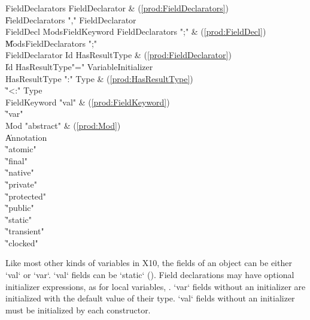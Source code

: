 \begin{bbgrammar}
    FieldDeclarators \: FieldDeclarator & (\ref{prod:FieldDeclarators}) \\
                     \| FieldDeclarators \xcd"," FieldDeclarator \\
           FieldDecl \: Mods\opt FieldKeyword FieldDeclarators \xcd";" & (\ref{prod:FieldDecl}) \\
                     \| Mods\opt FieldDeclarators \xcd";" \\
     FieldDeclarator \: Id HasResultType & (\ref{prod:FieldDeclarator}) \\
                     \| Id HasResultType\opt \xcd"=" VariableInitializer \\
       HasResultType \: \xcd":" Type & (\ref{prod:HasResultType}) \\
                     \| \xcd"<:" Type \\
        FieldKeyword \: \xcd"val" & (\ref{prod:FieldKeyword}) \\
                     \| \xcd"var" \\
                 Mod \: \xcd"abstract" & (\ref{prod:Mod}) \\
                     \| Annotation \\
                     \| \xcd"atomic" \\
                     \| \xcd"final" \\
                     \| \xcd"native" \\
                     \| \xcd"private" \\
                     \| \xcd"protected" \\
                     \| \xcd"public" \\
                     \| \xcd"static" \\
                     \| \xcd"transient" \\
                     \| \xcd"clocked" \\
\end{bbgrammar}

Like most other kinds of variables in X10, 
the fields of an object can be either \xcd`val` or \xcd`var`. 
\xcd`val` fields can be \xcd`static` ().
Field declarations may have optional
initializer expressions, as for local variables, .
\xcd`var` fields without an initializer are initialized with the default value
of their type. \xcd`val` fields without an initializer must be initialized by
each constructor.


